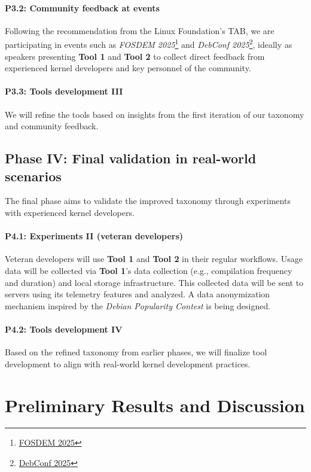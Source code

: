 \documentclass[sigconf]{acmart} %
\begin{document}
\paragraph{P3.2: Community feedback at events}
Following the recommendation from the Linux Foundation's TAB, we are
participating in events such as
\textit{FOSDEM 2025}\footnote{\href{https://fosdem.org/2025/}{FOSDEM 2025}} and
\textit{DebConf 2025}\footnote{\href{https://debconf25.debconf.org/}{DebConf
2025}}, ideally as speakers presenting \textbf{Tool 1} and \textbf{Tool 2} to
collect direct feedback from experienced kernel developers and key personnel of
the community.

\paragraph{P3.3: Tools development III}
We will refine the tools based on insights from the first iteration of our
taxonomy and community feedback.

\subsection{Phase IV: Final validation in real-world scenarios}
The final phase aims to validate the improved taxonomy through experiments with
experienced kernel developers.

\paragraph{P4.1: Experiments II (veteran developers)}
Veteran developers will use \textbf{Tool 1} and \textbf{Tool 2} in their regular
workflows. Usage data will be collected via \textbf{Tool 1}'s data collection
(e.g., compilation frequency and duration) and local storage infrastructure.
This collected data will be sent to servers using its telemetry features and
analyzed. A data anonymization mechanism inspired by the \textit{Debian
Popularity Contest} is being designed.

\paragraph{P4.2: Tools development IV}
Based on the refined taxonomy from earlier phases, we will finalize tool
development to align with real-world kernel development practices.

\section{Preliminary Results and Discussion}
\end{document}
